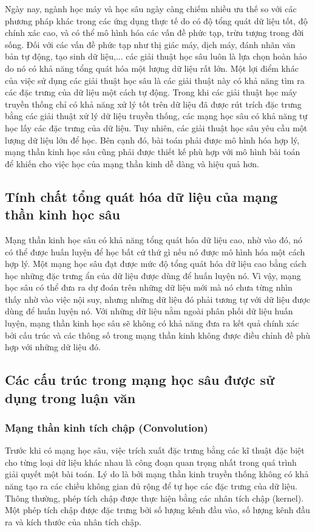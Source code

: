 Ngày nay, ngành học máy và học sâu ngày càng chiếm nhiều ưu thế so với các phương pháp khác trong các ứng dụng thực tế do có độ tổng quát dữ liệu tốt, độ chính xác cao, và có thể mô hình hóa các vấn đề phức tạp, trừu tượng trong đời sống. Đối với các vấn đề phức tạp như thị giác máy, dịch máy, đánh nhãn văn bản tự động, tạo sinh dữ liệu,... các giải thuật học sâu luôn là lựa chọn hoàn hảo do nó có khả năng tổng quát hóa một lượng dữ liệu rất lớn. Một lợi điểm khác của việc sử dụng các giải thuật học sâu là các giải thuật này có khả năng tìm ra các đặc trưng của dữ liệu một cách tự động. Trong khi các giải thuật học máy truyền thống chỉ có khả năng xử lý tốt trên dữ liệu đã được rút trích đặc trưng bằng các giải thuật xử lý dữ liệu truyền thống, các mạng học sâu có khả năng tự học lấy các đặc trưng của dữ liệu. Tuy nhiên, các giải thuật học sâu yêu cầu một lượng dữ liệu lớn để học. Bên cạnh đó, bài toán phải được mô hình hóa hợp lý, mạng thần kinh học sâu cũng phải được thiết kế phù hợp với mô hình bài toán để khiến cho việc học của mạng thần kinh dễ dàng và hiệu quả hơn.

\subsection{\texorpdfstring{Tính chất tổng quát hóa dữ liệu của mạng thần kinh học sâu}{dl_network}}
Mạng thần kinh học sâu có khả năng tổng quát hóa dữ liệu cao, nhờ vào đó, nó có thể được huấn luyện để học bất cứ thứ gì nếu nó được mô hình hóa một cách hợp lý. Một mạng học sâu đạt được mức độ tổng quát hóa dữ liệu cao bằng cách học những đặc trưng ẩn của dữ liệu được dùng để huấn luyện nó. Vì vậy, mạng học sâu có thể đưa ra dự đoán trên những dữ liệu mới mà nó chưa từng nhìn thấy nhờ vào việc nội suy, nhưng những dữ liệu đó phải tương tự với dữ liệu được dùng để huấn luyện nó. Với những dữ liệu nằm ngoài phân phối dữ liệu huấn luyện, mạng thần kinh học sâu sẽ không có khả năng đưa ra kết quả chính xác bởi cấu trúc và các thông số trong mạng thần kinh không được điều chỉnh đề phù hợp với những dữ liệu đó.

\subsection{\texorpdfstring{Các cấu trúc trong mạng học sâu được sử dụng trong luận văn}{dl_basic_structures}}

\subsubsection{Mạng thần kinh tích chập (Convolution)}
Trước khi có mạng học sâu, việc trích xuất đặc trưng bằng các kĩ thuật đặc biệt cho từng loại dữ liệu khác nhau là công đoạn quan trọng nhất trong quá trình giải quyết một bài toán. Lý do là bởi mạng thần kinh truyền thống không có khả năng tạo ra các chiều không gian đủ rộng để tự học các đặc trưng của dữ liệu. Thông thường, phép tích chập được thực hiện bằng các nhân tích chập (kernel). Một phép tích chập được đặc trưng bởi số lượng kênh đầu vào, số lượng kênh đầu ra và kích thước của nhân tích chập.

